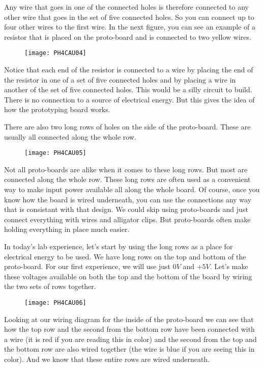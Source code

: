 Any wire that goes in one of the connected holes is therefore connected to any other wire that goes in the set of five connected holes. So you can connect up to four other wires to the first wire. In the next figure, you can see an example of a resistor that is placed on the proto-board and is connected to two yellow wires. 

\begin{figure}[h!]
	\centering
	\texttt{[image: PH4CAU04]}
\end{figure}

Notice that each end of the resistor is connected to a wire by placing the end of the resistor in one of a set of five connected holes and by placing a wire in another of the set of five connected holes. This would be a silly circuit to build. There is no
connection to a source of electrical energy. But this gives the idea of how the prototyping board works.

There are also two long rows of holes on the side of the proto-board. These are usually all connected along the whole row. 

\begin{figure}[h!]
	\centering
	\texttt{[image: PH4CAU05]}
\end{figure}

Not all proto-boards are alike when it comes to these long rows. But most are connected along the whole row. These long rows are often used as a convenient way to make input power available all along the whole board. Of course, once you know how the board is wired underneath, you can use the connections any way that is consistant
with that design. We could skip using proto-boards and just connect everything with wires and alligator clips. But proto-boards often make holding everything in place much easier.

In today's lab experience, let's start by using the long rows as a place for
electrical energy to be used. We have long rows on the top and bottom of the
proto-board. For our first experience, we will use just $0\unit{V}$ and $+5%
\unit{V}.$ Let's make these voltages available on both the top and the
bottom of the board by wiring the two sets of rows together. 

\begin{figure}[h!]
	\centering
	\texttt{[image: PH4CAU06]}
\end{figure}

Looking at our wiring diagram for the inside of the proto-board we can see that how the top row and the second from the bottom row have been connected with a wire (it is red if you are reading this in color) and the second from the top and the bottom row are also wired together (the wire is blue if you are seeing this in color). And we know that these entire rows are wired underneath. 

